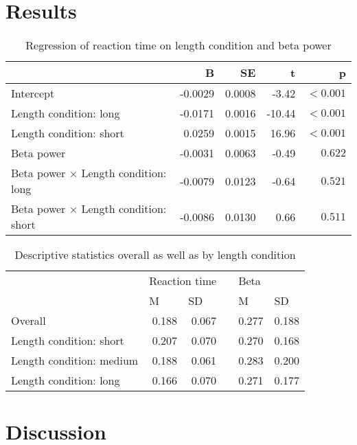 \documentclass[man,floatsintext]{apa6} %
\begin{document}
\section{Results}

\begin{table}[ht]
  \caption{Regression of reaction time on length condition and beta power}
  \centering
  \begin{tabular}{lrrrr}
    \toprule
                                                  & B        & SE         & t       & p         \\
    \midrule
    Intercept                                     & -0.0029  & 0.0008     &  -3.42  & $< 0.001$ \\
    Length condition: long                        & -0.0171  & 0.0016     & -10.44  & $< 0.001$ \\
    Length condition: short                       &  0.0259  & 0.0015     &  16.96  & $< 0.001$ \\
    Beta power                                    & -0.0031  & 0.0063     &  -0.49  & $0.622$   \\
    Beta power $\times$ Length condition: long    & -0.0079  & 0.0123     &  -0.64  & $0.521$   \\
    Beta power $\times$ Length condition: short   & -0.0086  & 0.0130     &   0.66  & $0.511$   \\
    \bottomrule
  \end{tabular}
\end{table}

\begin{table}[ht]
  \caption{Descriptive statistics overall as well as by length condition}
  \centering
  \begin{tabular}{lrrrrr}
    \toprule
                              & \multicolumn{2}{l}{Reaction time}              && \multicolumn{2}{l}{Beta}                       \\ \cmidrule{2-3} \cmidrule{5-6}
                              & \multicolumn{1}{l}{M} & \multicolumn{1}{l}{SD} && \multicolumn{1}{l}{M} & \multicolumn{1}{l}{SD} \\
    \midrule
    Overall                   & 0.188                 &  0.067                 && 0.277                 & 0.188                  \\
    Length condition: short   & 0.207                 &  0.070                 && 0.270                 & 0.168                  \\
    Length condition: medium  & 0.188                 &  0.061                 && 0.283                 & 0.200                  \\
    Length condition: long    & 0.166                 &  0.070                 && 0.271                 & 0.177                  \\
    \bottomrule
  \end{tabular}
\end{table}

\section{Discussion}



\end{document}
